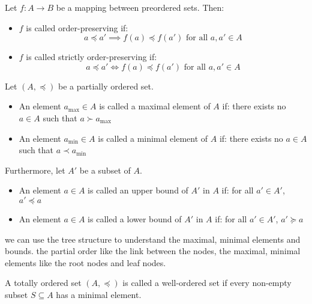 \documentclass[11pt,lang=en]{elegantbook}
\begin{document}
\begin{definition}
  Let $f : A \to B$ be a mapping between preordered sets. Then:
  \begin{itemize}
    \item $f$ is called order-preserving if:
    \[
      a \preceq a' \implies f(a) \preceq f(a') \text{ for all } a,a' \in A
    \]
    
    \item $f$ is called strictly order-preserving if:
    \[
      a \preceq a' \iff f(a) \preceq f(a') \text{ for all } a,a' \in A
    \]
  \end{itemize}
\end{definition}

\begin{definition}
  Let $(A,\preceq)$ be a partially ordered set.
  \begin{itemize}
    \item An element $a_{\max} \in A$ is called a maximal element of $A$ if: there exists no $a \in A$ such that $a \succ a_{\max}$
    
    \item An element $a_{\min} \in A$ is called a minimal element of $A$ if: there exists no $a \in A$ such that $a \prec a_{\min}$
  \end{itemize}
  
  Furthermore, let $A'$ be a subset of $A$.
  \begin{itemize}
    \item An element $a \in A$ is called an upper bound of $A'$ in $A$ if: for all $a' \in A'$, $a' \preceq a$
    
    \item An element $a \in A$ is called a lower bound of $A'$ in $A$ if: for all $a' \in A'$, $a' \succeq a$
  \end{itemize}
\end{definition}

\begin{remark}
  we can use the tree structure to understand the maximal, minimal elements and bounds. the partial order like the link between the nodes, the maximal, minimal elements like the root nodes and leaf nodes.
\end{remark}

\begin{definition}
  A totally ordered set $(A,\preceq)$ is called a well-ordered set if every non-empty subset $S \subseteq A$ has a minimal element.
\end{definition}
\end{document}
